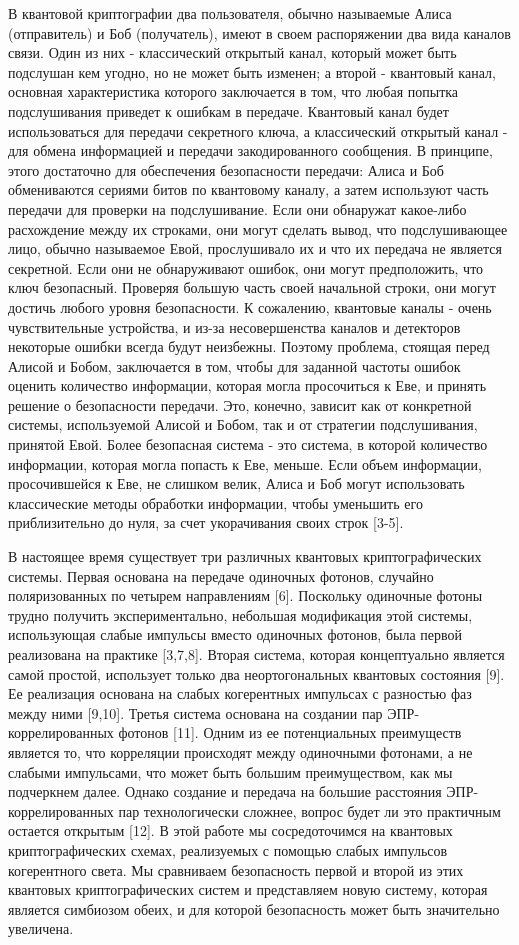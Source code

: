 В квантовой криптографии два пользователя, обычно называемые Алиса (отправитель) и Боб (получатель), имеют в своем распоряжении два вида каналов связи. Один из них - классический открытый канал, который может быть подслушан кем угодно, но не может быть изменен; а второй - квантовый канал, основная характеристика которого заключается в том, что любая попытка подслушивания приведет к ошибкам в передаче. Квантовый канал будет использоваться для передачи секретного ключа, а классический открытый канал - для обмена информацией и передачи закодированного сообщения. В принципе, этого достаточно для обеспечения безопасности передачи: Алиса и Боб обмениваются сериями битов по квантовому каналу, а затем используют часть передачи для проверки на подслушивание. Если они обнаружат какое-либо расхождение между их строками, они могут сделать вывод, что подслушивающее лицо, обычно называемое Евой, прослушивало их и что их передача не является секретной. Если они не обнаруживают ошибок, они могут предположить, что ключ безопасный. Проверяя большую часть своей начальной строки, они могут достичь любого уровня безопасности. К сожалению, квантовые каналы - очень чувствительные устройства, и из-за несовершенства каналов и детекторов некоторые ошибки всегда будут неизбежны. Поэтому проблема, стоящая перед Алисой и Бобом, заключается в том, чтобы для заданной частоты ошибок оценить количество информации, которая могла просочиться к Еве, и принять решение о безопасности передачи. Это, конечно, зависит как от конкретной системы, используемой Алисой и Бобом, так и от стратегии подслушивания, принятой Евой. Более безопасная система - это система, в которой количество информации, которая могла попасть к Еве, меньше. Если объем информации, просочившейся к Еве, не слишком велик, Алиса и Боб могут использовать классические методы обработки информации, чтобы уменьшить его приблизительно до нуля, за счет укорачивания своих строк [3-5].

В настоящее время существует три различных квантовых криптографических системы. Первая основана на передаче одиночных фотонов, случайно поляризованных по четырем направлениям [6].
Поскольку одиночные фотоны трудно получить экспериментально, небольшая модификация этой системы, использующая слабые импульсы вместо одиночных фотонов, была первой реализована на практике [3,7,8]. Вторая система, которая концептуально является самой простой, использует только два неортогональных квантовых состояния [9]. Ее реализация основана на слабых когерентных импульсах с разностью фаз между ними [9,10]. Третья система основана на создании пар ЭПР-коррелированных фотонов [11]. Одним из ее потенциальных преимуществ является то, что корреляции происходят между одиночными фотонами, а не слабыми импульсами, что может быть большим преимуществом, как мы подчеркнем далее. Однако создание и передача на большие расстояния ЭПР-коррелированных пар технологически сложнее, вопрос будет ли это практичным остается открытым [12]. В этой работе мы сосредоточимся на квантовых криптографических схемах, реализуемых с помощью слабых импульсов когерентного света. Мы сравниваем безопасность первой и второй из этих квантовых криптографических систем и представляем новую систему, которая является симбиозом обеих, и для которой безопасность может быть значительно увеличена.

